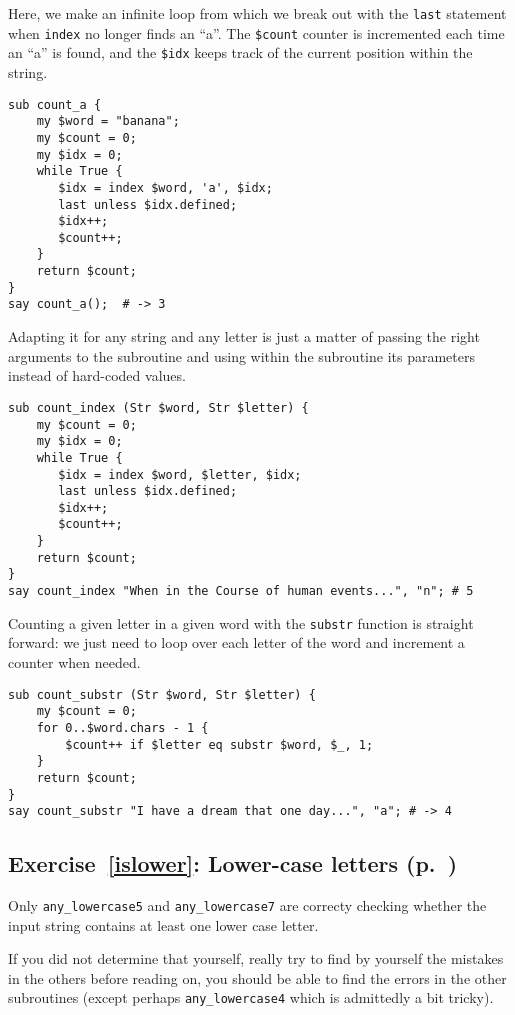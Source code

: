 Here, we make an infinite loop from which we break out with 
the {\tt last} statement when {\tt index} no longer finds 
an ``a''. The {\tt \$count} counter is incremented each time 
an ``a'' is found, and the {\tt \$idx} keeps track of the 
current position within the string.

\begin{verbatim}
sub count_a {
    my $word = "banana";
    my $count = 0;
    my $idx = 0;
    while True {
       $idx = index $word, 'a', $idx;
       last unless $idx.defined;
       $idx++;
       $count++;
    }
    return $count;
}
say count_a();  # -> 3
\end{verbatim}

Adapting it for any string and any letter is just a matter 
of passing the right arguments to the subroutine and using 
within the subroutine its parameters instead of hard-coded 
values.

\begin{verbatim}
sub count_index (Str $word, Str $letter) {
    my $count = 0;
    my $idx = 0;
    while True {
       $idx = index $word, $letter, $idx;
       last unless $idx.defined;
       $idx++;
       $count++;
    }
    return $count;
}
say count_index "When in the Course of human events...", "n"; # 5
\end{verbatim}

Counting a given letter in a given word with the {\tt substr} 
function is straight forward: we just need to loop over 
each letter of the word and increment a counter when needed.

\begin{verbatim}
sub count_substr (Str $word, Str $letter) {
    my $count = 0;
    for 0..$word.chars - 1 {
        $count++ if $letter eq substr $word, $_, 1;
    }
    return $count;
}
say count_substr "I have a dream that one day...", "a"; # -> 4
\end{verbatim}

\subsection{Exercise~\ref{islower}: Lower-case letters (p.~\pageref{islower})}
\label{sol_islower}

Only \verb'any_lowercase5' and \verb'any_lowercase7' are correcty 
checking whether the input string contains at least one lower 
case letter.

If you did not determine that yourself, really try to find by 
yourself the mistakes in the others before reading on, you should be 
able to find the errors in the other subroutines (except 
perhaps \verb'any_lowercase4' which is admittedly a bit tricky).

